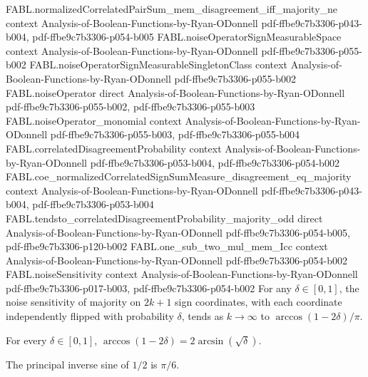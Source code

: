 \begin{theorem}
\proofstep
  {FABL.normalizedCorrelatedPairSum_mem_disagreement_iff_majority_ne}
  {context}
  {Analysis-of-Boolean-Functions-by-Ryan-ODonnell}
  {pdf-ffbe9c7b3306-p043-b004,
    pdf-ffbe9c7b3306-p054-b005}
\proofstep
  {FABL.noiseOperatorSignMeasurableSpace}
  {context}
  {Analysis-of-Boolean-Functions-by-Ryan-ODonnell}
  {pdf-ffbe9c7b3306-p055-b002}
\proofstep
  {FABL.noiseOperatorSignMeasurableSingletonClass}
  {context}
  {Analysis-of-Boolean-Functions-by-Ryan-ODonnell}
  {pdf-ffbe9c7b3306-p055-b002}
\proofstep
  {FABL.noiseOperator}
  {direct}
  {Analysis-of-Boolean-Functions-by-Ryan-ODonnell}
  {pdf-ffbe9c7b3306-p055-b002,
    pdf-ffbe9c7b3306-p055-b003}
\proofstep
  {FABL.noiseOperator_monomial}
  {context}
  {Analysis-of-Boolean-Functions-by-Ryan-ODonnell}
  {pdf-ffbe9c7b3306-p055-b003,
    pdf-ffbe9c7b3306-p055-b004}
\proofstep
  {FABL.correlatedDisagreementProbability}
  {context}
  {Analysis-of-Boolean-Functions-by-Ryan-ODonnell}
  {pdf-ffbe9c7b3306-p053-b004,
    pdf-ffbe9c7b3306-p054-b002}
\proofstep
  {FABL.coe_normalizedCorrelatedSignSumMeasure_disagreement_eq_majority}
  {context}
  {Analysis-of-Boolean-Functions-by-Ryan-ODonnell}
  {pdf-ffbe9c7b3306-p043-b004,
    pdf-ffbe9c7b3306-p053-b004}
\proofstep
  {FABL.tendsto_correlatedDisagreementProbability_majority_odd}
  {direct}
  {Analysis-of-Boolean-Functions-by-Ryan-ODonnell}
  {pdf-ffbe9c7b3306-p054-b005,
    pdf-ffbe9c7b3306-p120-b002}
\proofstep
  {FABL.one_sub_two_mul_mem_Icc}
  {context}
  {Analysis-of-Boolean-Functions-by-Ryan-ODonnell}
  {pdf-ffbe9c7b3306-p054-b002}
\proofstep
  {FABL.noiseSensitivity}
  {context}
  {Analysis-of-Boolean-Functions-by-Ryan-ODonnell}
  {pdf-ffbe9c7b3306-p017-b003,
    pdf-ffbe9c7b3306-p054-b002}
For any $\delta\in[0,1]$, the noise sensitivity of majority on $2k+1$ sign coordinates,
with each coordinate independently flipped with probability $\delta$, tends as
$k\to\infty$ to $\arccos(1-2\delta)/\pi$.
\end{theorem}

\begin{theorem}
\label{FABL.arccos_one_sub_two_mul_eq_two_mul_arcsin_sqrt}
\leanok
{}
For every $\delta\in[0,1]$, $\arccos(1-2\delta)=2\arcsin(\sqrt{\delta})$.
\end{theorem}

\begin{theorem}
\label{FABL.arcsin_one_half}
\leanok
{}
The principal inverse sine of $1/2$ is $\pi/6$.
\end{theorem}


